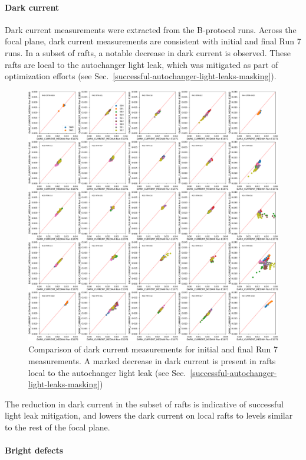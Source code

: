 \paragraph{Dark current}\label{sec:finaldark-current}

Dark current measurements were extracted from the B-protocol runs. Across the focal plane, dark current measurements are consistent with initial and final Run 7 runs. In a subset of rafts, a notable decrease in dark current is observed. These rafts are local to the autochanger light leak, which was mitigated as part of optimization efforts (see Sec.~\ref{successful-autochanger-light-leaks-masking}).

\begin{figure}[ht]
    \centering
    \includegraphics[width=0.7\linewidth]{figures/finalCharacterization/E1071_E1880_DARK_CURRENT_MEDIAN.png}
    \caption{Comparison of dark current measurements for initial and final Run 7 measurements. A marked decrease in dark current is present in rafts local to the autochanger light leak (see Sec.~\ref{successful-autochanger-light-leaks-masking})}
    \label{fig:finalChar-DarkCurrent-5x5}
\end{figure}

The reduction in dark current in the subset of rafts is indicative of successful light leak mitigation, and lowers the dark current on local rafts to levels similar to the rest of the focal plane.

\paragraph{Bright defects}\label{final-bright-defects}

